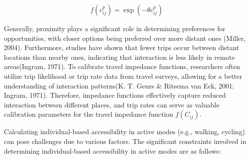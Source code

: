 \documentclass[
11pt, %
oneside, %
english, %
singlespacing, %
]{macthesis} %
\begin{document}
\begin{equation}
f(c^p_{ij}) = \exp(-\theta c^p_{ij})
\label{eq:ch02-equation-05}
\end{equation}

Generally, proximity plays a significant role in determining preferences for opportunities, with closer options being preferred over more distant ones (Miller, 2004). Furthermore, studies have shown that fewer trips occur between distant locations than nearby ones, indicating that interaction is less likely in remote areas(Ingram, 1971). To calibrate travel impedance functions, researchers often utilize trip likelihood or trip rate data from travel surveys, allowing for a better understanding of interaction patterns(K. T. Geurs \& Ritsema van Eck, 2001; Ingram, 1971). Therefore, impedance functions effectively capture reduced interaction between different places, and trip rates can serve as valuable calibration parameters for the travel impedance function \(f(C_{ij})\).

Calculating individual-based accessibility in active modes (e.g., walking, cycling) can pose challenges due to various factors. The significant constraints involved in determining individual-based accessibility in active modes are as follows:
\end{document}
